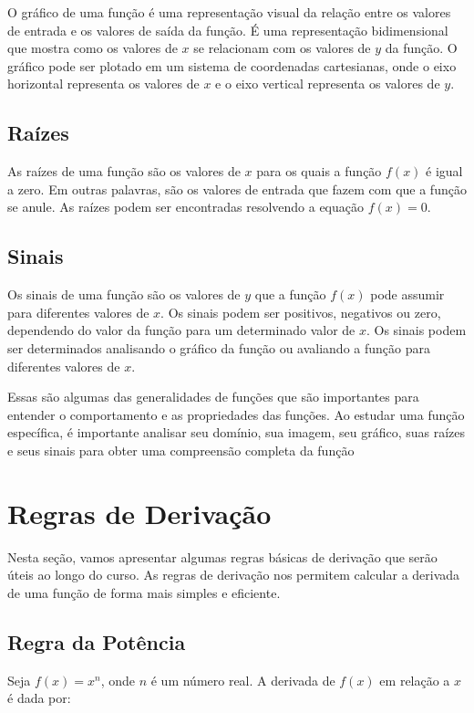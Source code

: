 \documentclass[12pt]{article}
\begin{document}
O gráfico de uma função é uma representação visual da relação entre os valores de entrada e os valores de saída da função. É uma representação bidimensional que mostra como os valores de $x$ se relacionam com os valores de $y$ da função. O gráfico pode ser plotado em um sistema de coordenadas cartesianas, onde o eixo horizontal representa os valores de $x$ e o eixo vertical representa os valores de $y$.

\subsection{Raízes}

As raízes de uma função são os valores de $x$ para os quais a função $f(x)$ é igual a zero. Em outras palavras, são os valores de entrada que fazem com que a função se anule. As raízes podem ser encontradas resolvendo a equação $f(x) = 0$.

\subsection{Sinais}

Os sinais de uma função são os valores de $y$ que a função $f(x)$ pode assumir para diferentes valores de $x$. Os sinais podem ser positivos, negativos ou zero, dependendo do valor da função para um determinado valor de $x$. Os sinais podem ser determinados analisando o gráfico da função ou avaliando a função para diferentes valores de $x$.

Essas são algumas das generalidades de funções que são importantes para entender o comportamento e as propriedades das funções. Ao estudar uma função específica, é importante analisar seu domínio, sua imagem, seu gráfico, suas raízes e seus sinais para obter uma compreensão completa da função


\section{Regras de Derivação}
Nesta seção, vamos apresentar algumas regras básicas de derivação que serão úteis ao longo do curso. As regras de derivação nos permitem calcular a derivada de uma função de forma mais simples e eficiente.

\subsection{Regra da Potência}
Seja $f(x) = x^n$, onde $n$ é um número real. A derivada de $f(x)$ em relação a $x$ é dada por:
\end{document}
